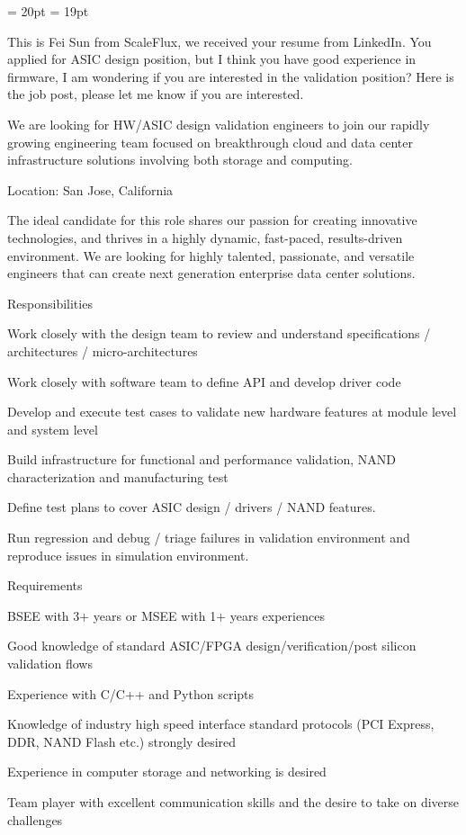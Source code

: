 \break

\FFrj \baselineskip = 20pt
\FFri \baselineskip = 19pt
\par This is Fei Sun from ScaleFlux, we received your resume from LinkedIn. You applied for ASIC design position, but I think you have good experience in firmware, I am wondering if you are interested in the  validation position? Here is the job post, please let me know if you are interested.
\par We are looking for HW/ASIC design validation engineers to join our rapidly growing engineering team focused on breakthrough cloud and data center infrastructure solutions involving both storage and computing.
\par Location: San Jose, California
\par The ideal candidate for this role shares our passion for creating innovative technologies, and thrives in a highly dynamic, fast-paced, results-driven environment. We are looking for highly talented, passionate, and versatile engineers that can create next generation enterprise data center solutions.
\par Responsibilities
\par * Work closely with the design team to review and understand specifications / architectures / micro-architectures
\par * Work closely with software team to define API and develop driver code
\par * Develop and execute test cases to validate new hardware features at module level and system level
\par * Build infrastructure for functional and performance validation, NAND characterization and manufacturing test
\par * Define test plans to cover ASIC design / drivers / NAND features.
\par * Run regression and debug / triage failures in validation environment and reproduce issues in simulation environment.
\par Requirements
\par * BSEE with 3+ years or MSEE with 1+ years experiences
\par * Good knowledge of standard ASIC/FPGA design/verification/post silicon validation flows
\par * Experience with C/C++ and Python scripts
\par * Knowledge of industry high speed interface standard protocols (PCI Express, DDR, NAND Flash etc.) strongly desired
\par * Experience in computer storage and networking is desired
\par * Team player with excellent communication skills and the desire to take on diverse challenges

\bye
